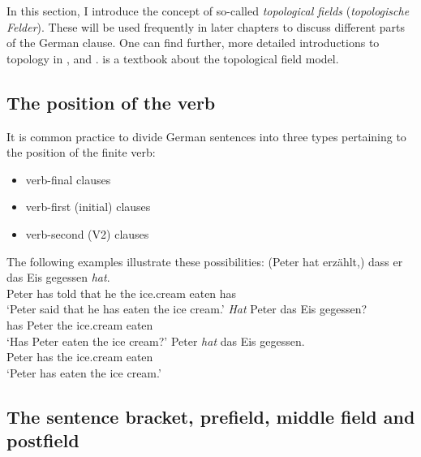 {%

In this section, I introduce the concept of so-called \emph{topological fields} (\emph{topologische Felder}). These will be used frequently in later chapters to
discuss different parts of the German clause. One can find further, more detailed introductions to topology in ,
 and .  is a
textbook about the topological field model.




\subsection{The position of the verb}

It is common practice to divide German sentences into three types pertaining to the position of the finite verb:
\begin{itemize}
\item verb-final clauses
\item verb-first (initial) clauses
\item verb-second (V2) clauses
\end{itemize}

The following examples illustrate these possibilities:
\eal
\ex 
\gll (Peter hat erzählt,) dass er das Eis gegessen \emph{hat}.\\
     Peter has told that he the ice.cream eaten has\\
\glt `Peter said that he has eaten the ice cream.'
\ex 
\gll \emph{Hat} Peter das Eis gegessen?\\
	 has Peter the ice.cream eaten\\
\glt `Has Peter eaten the ice cream?'
\ex 
\gll Peter \emph{hat} das Eis gegessen.\\
	 Peter has the ice.cream eaten\\
\glt `Peter has eaten the ice cream.'
\zl


\subsection{The sentence bracket, prefield, middle field and postfield}

}
